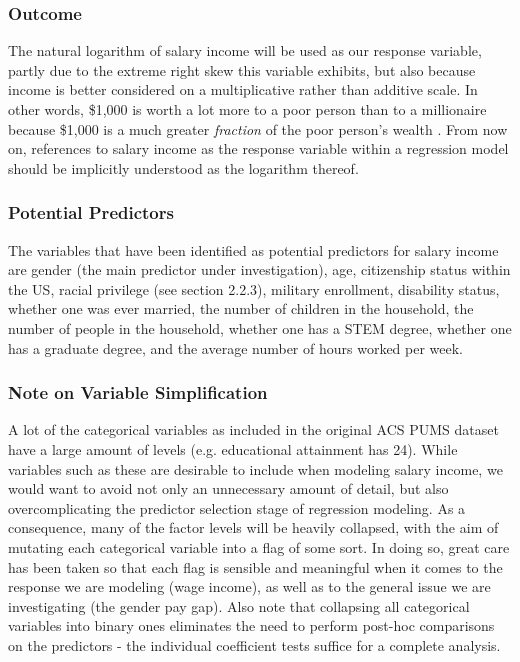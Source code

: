 \documentclass{article}
\begin{document}
\subsubsection{Outcome}

The natural logarithm of salary income will be used as our response variable, partly due to the extreme right skew this variable exhibits, but also because income is better considered on a multiplicative rather than additive scale. In other words, \$1,000 is worth a lot more to a poor person than to a millionaire because \$1,000 is a much greater \textit{fraction} of the poor person's wealth \cite{faraway}. From now on, references to salary income as the response variable within a regression model should be implicitly understood as the logarithm thereof.

\subsubsection{Potential Predictors}

The variables that have been identified as potential predictors for salary income are gender (the main predictor under investigation), age, citizenship status within the US, racial privilege (see section 2.2.3), military enrollment, disability status, whether one was ever married, the number of children in the household, the number of people in the household, whether one has a STEM degree, whether one has a graduate degree, and the average number of hours worked per week. 

\subsubsection{Note on Variable Simplification}

A lot of the categorical variables as included in the original ACS PUMS dataset have a large amount of levels (e.g. educational attainment has 24). While variables such as these are desirable to include when modeling salary income, we would want to avoid not only an unnecessary amount of detail, but also overcomplicating the predictor selection stage of regression modeling. As a consequence, many of the factor levels will be heavily collapsed, with the aim of mutating each categorical variable into a flag of some sort. In doing so, great care has been taken so that each flag is sensible and meaningful when it comes to the response we are modeling (wage income), as well as to the general issue we are investigating (the gender pay gap). Also note that collapsing all categorical variables into binary ones eliminates the need to perform post-hoc comparisons on the predictors - the individual coefficient tests suffice for a complete analysis.
\end{document}
